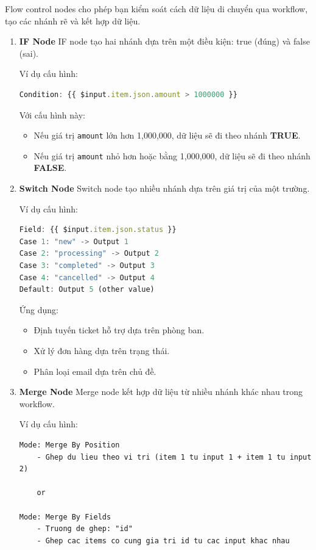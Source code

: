 Flow control nodes cho phép bạn kiểm soát cách dữ liệu di chuyển qua workflow, tạo các nhánh rẽ và kết hợp dữ liệu.
\begin{enumerate}
    \item \textbf{IF Node}  
    IF node tạo hai nhánh dựa trên một điều kiện: true (đúng) và false (sai).  

    Ví dụ cấu hình:
\begin{lstlisting}[language=JavaScript]
Condition: {{ $input.item.json.amount > 1000000 }}    
\end{lstlisting}

    Với cấu hình này:
    \begin{itemize}
        \item Nếu giá trị \texttt{amount} lớn hơn 1,000,000, dữ liệu sẽ đi theo nhánh \textbf{TRUE}.
        \item Nếu giá trị \texttt{amount} nhỏ hơn hoặc bằng 1,000,000, dữ liệu sẽ đi theo nhánh \textbf{FALSE}.
    \end{itemize}
    
    \item \textbf{Switch Node}  
    Switch node tạo nhiều nhánh dựa trên giá trị của một trường.  

    Ví dụ cấu hình:
\begin{lstlisting}[language=JavaScript]
Field: {{ $input.item.json.status }}
Case 1: "new" -> Output 1
Case 2: "processing" -> Output 2
Case 3: "completed" -> Output 3
Case 4: "cancelled" -> Output 4
Default: Output 5 (other value)
\end{lstlisting}

    Ứng dụng:
    \begin{itemize}
        \item Định tuyến ticket hỗ trợ dựa trên phòng ban.
        \item Xử lý đơn hàng dựa trên trạng thái.
        \item Phân loại email dựa trên chủ đề.
    \end{itemize}

    \item \textbf{Merge Node}  
    Merge node kết hợp dữ liệu từ nhiều nhánh khác nhau trong workflow.  

    Ví dụ cấu hình:
\begin{verbatim}
Mode: Merge By Position
    - Ghep du lieu theo vi tri (item 1 tu input 1 + item 1 tu input 2)
    
    or
    
Mode: Merge By Fields
    - Truong de ghep: "id"
    - Ghep cac items co cung gia tri id tu cac input khac nhau
\end{verbatim}


\end{enumerate}
